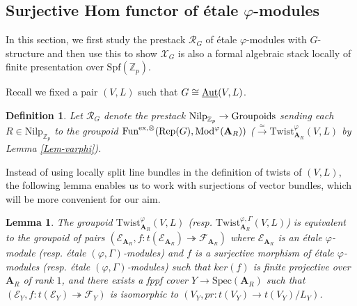 \documentclass[10pt]{article}
\newtheorem{lem}[thm]{Lemma}
\newtheorem{dfn}[thm]{Definition}
\numberwithin{equation}{section}
\newcommand{\bZ}{{\mathbb Z}}
\newcommand{\calE}{{\mathcal E}}
\newcommand{\calF}{{\mathcal F}}
\newcommand{\calL}{{\mathcal L}}
\newcommand{\calR}{{\mathcal R}}
\newcommand{\calX}{{\mathcal X}}
\newcommand{\Mod}{{\mathrm{Mod}}}           %
\newcommand{\Rep}{{\mathrm{Rep}}}           %
\newcommand{\Spf}{{\mathrm{Spf}}}           %
\newcommand{\Spec}{{\mathrm{Spec}}}         %
\newcommand{\Nilp}{\mathrm{Nilp}}
\newcommand{\bfA}{{\textbf{A}}}
\newcommand{\Fun}{\mathrm{Fun}}
\newcommand{\Twist}{\mathrm{Twist}}
\begin{document}
\subsection{Surjective Hom functor of \'etale $\varphi$-modules}\label{subsec2.2}
In this section, we first study the prestack $\calR_G$ of \'etale $\varphi$-modules with $G$-structure and then use this to show $\calX_G$ is also a formal algebraic stack locally of finite presentation over $\Spf(\bZ_p)$.


Recall we fixed a pair $(V,L)$ such that $G\cong \underline{\mathrm{Aut}}(V,L)$. 
\begin{dfn}

 Let $\calR_G$ denote the prestack $\Nilp_{\bZ_p}\to {\rm Groupoids}$ sending each $R\in \Nilp_{\bZ_p}$ to the groupoid $\Fun^{{\rm ex},\otimes}(\Rep(G),\Mod^{\varphi}(\bfA_R))$ ($\xrightarrow{\simeq} \Twist^{\varphi}_{\bfA_R}(V,L)$ by Lemma \ref{Lem-varphi}).
        
\end{dfn}


Instead of using locally split line bundles in the definition of twists of $(V,L)$, the following lemma enables us to work with surjections of vector bundles, which will be more convenient for our aim.

\begin{lem}\label{easy-description}
    The groupoid $\Twist^{\varphi}_{\bfA_R}(V,L)$ (resp. $\Twist^{\varphi,\Gamma}_{\bfA_R}(V,L)$) is equivalent to the groupoid of pairs $(\calE_{\bfA_R},f:t(\calE_{\bfA_R})\twoheadrightarrow \calF_{\bfA_R})$ where $\calE_{\bfA_R}$ is an \'etale $\varphi$-module (resp. \'etale $(\varphi,\Gamma)$-modules) and $f$ is a surjective morphism of \'etale $\varphi$-modules (resp. \'etale $(\varphi,\Gamma)$-modules) such that $ker(f)$ is finite projective over $\bfA_R$ of rank $1$, and there exists a fppf cover $Y\to \Spec(\bfA_R)$ such that $(\calE_{Y},f:t(\calE_{Y})\twoheadrightarrow \calF_{Y})$ is isomorphic to $(V_Y, pr: t(V_Y)\to t(V_Y)/L_Y)$. 
\end{lem}
\end{document}
